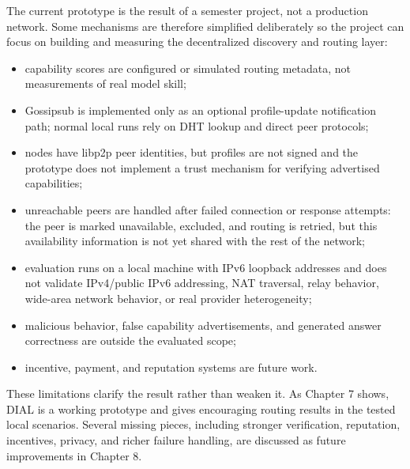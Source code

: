 The current prototype is the result of a semester project, not a production
network. Some mechanisms are therefore simplified deliberately so the project
can focus on building and measuring the decentralized discovery and routing
layer:

\begin{itemize}
  \item capability scores are configured or simulated routing metadata, not
  measurements of real model skill;
  \item Gossipsub is implemented only as an optional profile-update notification
  path; normal local runs rely on DHT lookup and direct peer protocols;
  \item nodes have libp2p peer identities, but profiles are not signed and the
  prototype does not implement a trust mechanism for verifying advertised
  capabilities;
  \item unreachable peers are handled after failed connection or response
  attempts: the peer is marked unavailable, excluded, and routing is retried,
  but this availability information is not yet shared with the rest of the
  network;
  \item evaluation runs on a local machine with IPv6 loopback addresses and
  does not validate IPv4/public IPv6 addressing, NAT traversal, relay behavior,
  wide-area network behavior, or real provider heterogeneity;
  \item malicious behavior, false capability advertisements, and generated
  answer correctness are outside the evaluated scope;
  \item incentive, payment, and reputation systems are future work.
\end{itemize}

These limitations clarify the result rather than weaken it. As Chapter 7 shows,
DIAL is a working prototype and gives encouraging routing results in the tested
local scenarios. Several missing pieces, including stronger verification,
reputation, incentives, privacy, and richer failure handling, are discussed as
future improvements in Chapter 8.
